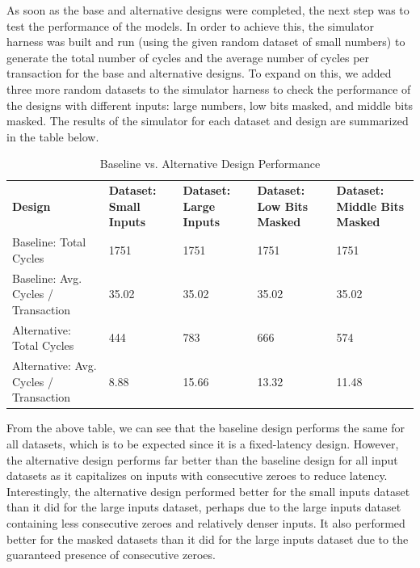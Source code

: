 \documentclass[11pt]{article}
\begin{document}
As soon as the base and alternative designs were completed, the next step was to test the performance of the models. In order to achieve this, the simulator harness was built and run (using the given random dataset of small numbers) to generate the total number of cycles and the average number of cycles per transaction for the base and alternative designs. To expand on this, we added three more random datasets to the simulator harness to check the performance of the designs with different inputs: large numbers, low bits masked, and middle bits masked. The results of the simulator for each dataset and design are summarized in the table below.

\begin{table}[h]
\begin{tabular} {p{2cm} | p{3cm} | p{3cm} | p{3cm} | p{3cm} }

\hline
\textbf{Design}    & \textbf{Dataset: Small Inputs} & \textbf{Dataset: Large Inputs} & \textbf{Dataset: Low Bits Masked} & \textbf{Dataset: Middle Bits Masked} \\
Baseline: Total Cycles                    & 1751                           & 1751                           & 1751                       & 1751    \\
Baseline: Avg. Cycles / Transaction       & 35.02                          & 35.02                          & 35.02                      & 35.02   \\
Alternative: Total Cycles                 & 444                            & 783                            & 666                        & 574     \\
Alternative: Avg. Cycles / Transaction    & 8.88                           & 15.66                          & 13.32                      & 11.48   \\
\hline                    
\end{tabular}
\caption{Baseline vs. Alternative Design Performance}
\end{table}


From the above table, we can see that the baseline design performs the same for all datasets, which is to be expected since it is a fixed-latency design. However, the alternative design performs far better than the baseline design for all input datasets as it capitalizes on inputs with consecutive zeroes to reduce latency. Interestingly, the alternative design performed better for the small inputs dataset than it did for the large inputs dataset, perhaps due to the large inputs dataset containing less consecutive zeroes and relatively denser inputs. It also performed better for the masked datasets than it did for the large inputs dataset due to the guaranteed presence of consecutive zeroes.
\end{document}
